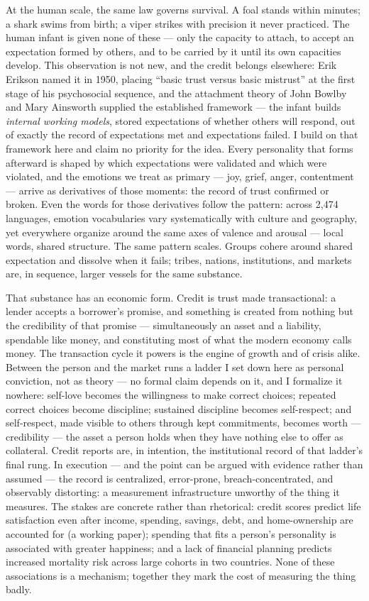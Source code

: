 \documentclass[
]{article}
\begin{document}
At the human scale, the same law governs survival. A foal stands within
minutes; a shark swims from birth; a viper strikes with precision it
never practiced. The human infant is given none of these --- only the
capacity to attach, to accept an expectation formed by others, and to be
carried by it until its own capacities develop. This observation is not
new, and the credit belongs elsewhere: Erik Erikson named it in 1950,
placing ``basic trust versus basic mistrust'' at the first stage of his
psychosocial sequence, and the attachment theory of John Bowlby and Mary
Ainsworth supplied the established framework --- the infant builds
\emph{internal working models}, stored expectations of whether others
will respond, out of exactly the record of expectations met and
expectations failed. I build on that framework here and claim no
priority for the idea. Every personality that forms afterward is shaped
by which expectations were validated and which were violated, and the
emotions we treat as primary --- joy, grief, anger, contentment ---
arrive as derivatives of those moments: the record of trust confirmed or
broken. Even the words for those derivatives follow the pattern: across
2,474 languages, emotion vocabularies vary systematically with culture
and geography, yet everywhere organize around the same axes of valence
and arousal --- local words, shared structure. The same pattern scales.
Groups cohere around shared expectation and dissolve when it fails;
tribes, nations, institutions, and markets are, in sequence, larger
vessels for the same substance.

That substance has an economic form. Credit is trust made transactional:
a lender accepts a borrower's promise, and something is created from
nothing but the credibility of that promise --- simultaneously an asset
and a liability, spendable like money, and constituting most of what the
modern economy calls money. The transaction cycle it powers is the
engine of growth and of crisis alike. Between the person and the market
runs a ladder I set down here as personal conviction, not as theory ---
no formal claim depends on it, and I formalize it nowhere: self-love
becomes the willingness to make correct choices; repeated correct
choices become discipline; sustained discipline becomes self-respect;
and self-respect, made visible to others through kept commitments,
becomes worth --- credibility --- the asset a person holds when they
have nothing else to offer as collateral. Credit reports are, in
intention, the institutional record of that ladder's final rung. In
execution --- and the point can be argued with evidence rather than
assumed --- the record is centralized, error-prone, breach-concentrated,
and observably distorting: a measurement infrastructure unworthy of the
thing it measures. The stakes are concrete rather than rhetorical:
credit scores predict life satisfaction even after income, spending,
savings, debt, and home-ownership are accounted for (a working paper);
spending that fits a person's personality is associated with greater
happiness; and a lack of financial planning predicts increased mortality
risk across large cohorts in two countries. None of these associations
is a mechanism; together they mark the cost of measuring the thing
badly.
\end{document}
